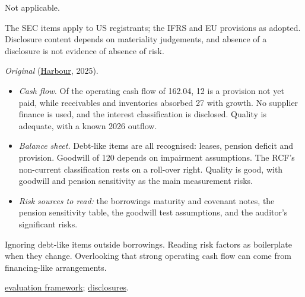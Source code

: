 \begin{qfmethod}
 Not applicable.

 The SEC items apply to US registrants; the IFRS and EU provisions as adopted. Disclosure content depends on materiality judgements, and absence of a disclosure is not evidence of absence of risk.

 \emph{Original} (\hyperref[ex:harbour-tools-statements]{Harbour}, 2025).
\begin{itemize}
\item \emph{Cash flow.} Of the operating cash flow of 162.04, 12 is a provision not yet paid, while receivables and inventories absorbed 27 with growth. No supplier finance is used, and the interest classification is disclosed. Quality is adequate, with a known 2026 outflow.
\item \emph{Balance sheet.} Debt-like items are all recognised: leases, pension deficit and provision. Goodwill of 120 depends on impairment assumptions. The RCF's non-current classification rests on a roll-over right. Quality is good, with goodwill and pension sensitivity as the main measurement risks.
\item \emph{Risk sources to read:} the borrowings maturity and covenant notes, the pension sensitivity table, the goodwill test assumptions, and the auditor's significant risks.
\end{itemize}

 Ignoring debt-like items outside borrowings. Reading risk factors as boilerplate when they change. Overlooking that strong operating cash flow can come from financing-like arrangements.

 \hyperref[meth:report-quality-evaluation]{evaluation framework}; \hyperref[def:long-term-liability-compensation-disclosures]{disclosures}.

\end{qfmethod}
